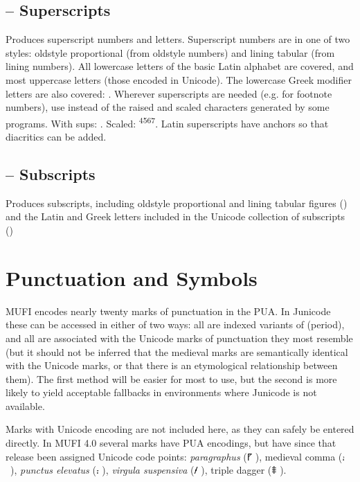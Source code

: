 \subsection{ – Superscripts}
Produces superscript numbers and letters. Superscript numbers are in one of two styles: 
oldstyle proportional (from oldstyle numbers) and lining tabular (from lining numbers). All lowercase
letters of the basic Latin alphabet are covered, and most uppercase letters (those encoded in Unicode).
The lowercase Greek modifier letters are also covered:  .
Wherever superscripts are needed (e.g. for footnote numbers), use  instead of the raised 
and scaled characters generated by some programs. With sups: . Scaled: \textsuperscript{4567}. 
Latin superscripts have anchors so that diacritics can be added.

\subsection{ – Subscripts}
Produces subscripts, including oldstyle proportional and lining tabular figures
() and the Latin and Greek letters included in the Unicode collection of subscripts
()

\section{Punctuation and Symbols}

MUFI encodes nearly twenty marks of punctuation in the PUA. In Junicode these can be accessed in
either of two ways: all are indexed variants of  (period), and all are associated with the Unicode marks of
punctuation they most resemble (but it should not be inferred that the medieval marks are semantically identical with
the Unicode marks, or that there is an etymological relationship between them). The first method will be easier for
most to use, but the second is more likely to yield acceptable fallbacks in environments where Junicode is not
available.

Marks with Unicode encoding are not included here, as they can safely be entered directly. In MUFI 4.0 several marks
have PUA encodings, but have since that release been assigned Unicode code points: \textit{paragraphus} (⹍
), medieval comma (⹌~), \textit{punctus elevatus} (⹎ ), \textit{virgula suspensiva}
(⹊ ), triple dagger (⹋ ).

